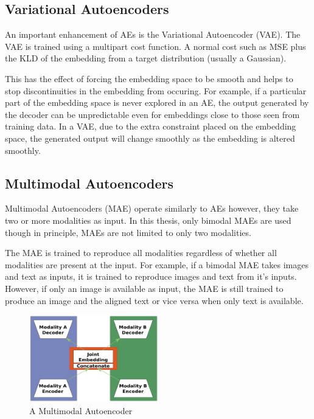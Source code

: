 \subsection{Variational Autoencoders}
An important enhancement of AEs is the Variational Autoencoder (VAE). The VAE is trained using a multipart cost function. A normal cost such as MSE plus the KLD of the embedding from a target distribution (usually a Gaussian).

This has the effect of forcing the embedding space to be smooth and helps to stop discontinuities in the embedding from occuring. For example, if a particular part of the embedding space is never explored in an AE, the output generated by the decoder can be unpredictable even for embeddings close to those seen from training data. In a VAE, due to the extra constraint placed on the embedding space, the generated output will change smoothly as the embedding is altered smoothly.


\subsection{Multimodal Autoencoders}
Multimodal Autoencoders (MAE) operate similarly to AEs however, they take two or more modalities as input. In this thesis, only bimodal MAEs are used though in principle, MAEs are not limited to only two modalities.

The MAE is trained to reproduce all modalities regardless of whether all modalities are present at the input. For example, if a bimodal MAE takes images and text as inputs, it is trained to reproduce images and text from it's inputs. However, if only an image is available as input, the MAE is still trained to produce an image and the aligned text or vice versa when only text is available.


\begin{figure}
	\centering
	\includegraphics[width=0.5\textwidth]{Figs/intro2dl/MAE.png}
	
	\caption{A Multimodal Autoencoder}
	\label{fig:mae}
\end{figure}

